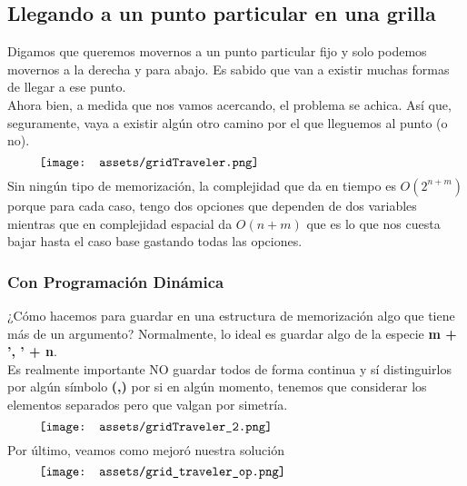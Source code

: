 \documentclass[10pt,a4paper]{article}
\begin{document}
\subsection*{Llegando a un punto particular en una grilla}
Digamos que queremos movernos a un punto particular fijo y solo podemos movernos a la derecha y para abajo. Es sabido que van a existir muchas formas de llegar a ese punto. \\
Ahora bien, a medida que nos vamos acercando, el problema se achica. Así que, seguramente, vaya a existir algún otro camino por el que lleguemos al punto (o no). 
\[\begin{minipage}[b]{0.9\textwidth}
    \texttt{[image: assets/gridTraveler.png]}
\end{minipage}\]
Sin ningún tipo de memorización, la complejidad que da en tiempo es $O(2^{n+m})$ porque para cada caso, tengo dos opciones que dependen de dos variables mientras que en complejidad espacial da $O(n+m)$ que es lo que nos cuesta bajar hasta el caso base gastando todas las opciones.
\subsubsection*{Con Programación Dinámica}
¿Cómo hacemos para guardar en una estructura de memorización algo que tiene más de un argumento? Normalmente, lo ideal es guardar algo de la especie \textbf{m + ', ' + n}. \\
Es realmente importante NO guardar todos de forma continua y sí distinguirlos por algún símbolo \textbf{(,)} por si en algún momento, tenemos que considerar los elementos separados pero que valgan por simetría.
\[\begin{minipage}[b]{0.9\textwidth}
    \texttt{[image: assets/gridTraveler\_2.png]}
\end{minipage}\]
Por último, veamos como mejoró nuestra solución\[\begin{minipage}[b]{0.9\textwidth}
    \texttt{[image: assets/grid\_traveler\_op.png]}
\end{minipage}\]
\end{document}
